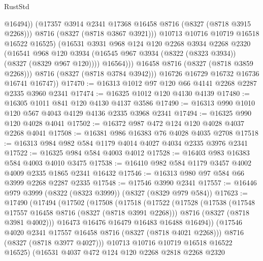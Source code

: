 \begin{lexlean}{RustStd}
\begin{coremodule}
{\begin{coremodule}
{{{{{{{{{{{{{{{{{{{{{{{{{{{{{{{{{{{{{{{{{{{{{{{{{{{{{{                        @16494))
                    (@17357 @3914 @2341 @17368 @16458 @8716 (@8327 (@8718 @3915 @2268)))
                    @8716
                    (@8327 (@8718 @3867 @3921)))
                  @10713
                  @10716
                  @10719
                  @16518
                  @16522
                  @16525)
                (@16531
                  @3931
                  @968
                  @124
                  @120
                  @2268
                  @3934
                  @2268
                  @2320
                  (@16541
                    @968
                    @120
                    @3934
                    (@16545 @967 @3934 (@8322 (@8323 @3934)) (@8327 (@8329 @967 @120))))
                  @16564)))
            @16458
            @8716
            (@8327 (@8718 @3859 @2268)))
          @8716
          (@8327 (@8718 @3784 @3942)))
        @16726
        @16729
        @16732
        @16736
        @16741
        @16747))
@17470 := @16313 @1012 @97 @120 @66 @4141 @2268 @2287 @2335 @3960 @2341
@17474 := @16325 @1012 @120 @4130 @4139
@17480 := @16305 @1011 @841 @120 @4130 @4137 @3586
@17490 := @16313 @990 @1010 @120 @567 @4043 @4129 @4136 @2335 @3968 @2341
@17494 := @16325 @990 @120 @4028 @4041
@17502 := @16372 @987 @472 @124 @120 @4028 @4037 @2268 @4041
@17508 := @16381 @986 @16383 @76 @4028 @4035 @2708
@17518 := @16313 @984 @982 @584 @1179 @4014 @4027 @4034 @2335 @3976 @2341
@17522 := @16325 @984 @584 @4003 @4012
@17528 := @16403 @983 @16383 @584 @4003 @4010 @3475
@17538 := @16410 @982 @584 @1179 @3457 @4002 @4009 @2335 @1865 @2341 @16432
@17546 := @16313 @980 @97 @584 @66 @3999 @2268 @2287 @2335
@17548 := @17546 @3990 @2341
@17557 := @16446 @979 @3999 (@8322 (@8323 @3999)) (@8327 (@8329 @979 @584))
@17623 := @17490
    (@17494
      (@17502
        (@17508
          (@17518
            (@17522
              (@17528
                (@17538
                  (@17548 @17557 @16458 @8716 (@8327 (@8718 @3991 @2268)))
                  @8716
                  (@8327 (@8718 @3981 @4002)))
                @16473
                @16476
                @16479
                @16483
                @16488
                @16494))
            (@17546 @4020 @2341 @17557 @16458 @8716 (@8327 (@8718 @4021 @2268)))
            @8716
            (@8327 (@8718 @3977 @4027)))
          @10713
          @10716
          @10719
          @16518
          @16522
          @16525)
        (@16531
          @4037
          @472
          @124
          @120
          @2268
          @2818
          @2268
          @2320
}}}}}}}}}}}}}}}}}}}}}}}}}}}}}}}}}}}}}}}}}}}}}}}}}}}}}}
\end{coremodule}}
\end{coremodule}
\end{lexlean}
